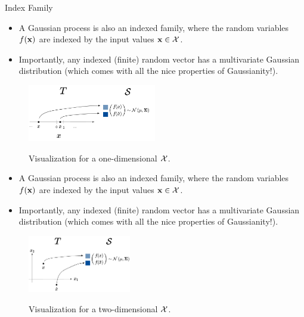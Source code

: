 \begin{frame}[c,allowframebreaks]{Index Family}
\begin{itemize}
  \item A Gaussian process is also an indexed family, where the random variables $f(\mathbf{x})$ are indexed by the input values $\mathbf{x}\in\mathcal{X}$. 
  \item Importantly, any indexed (finite) random vector has a multivariate Gaussian distribution (which comes with all the nice properties of Gaussianity!). 
\end{itemize}

\lz

\begin{figure}
\includegraphics[width=0.5\textwidth]{figure_man/indexed_family/indexed_family_5.png}\par
\begin{footnotesize}
Visualization for a one-dimensional $\mathcal{X}$.
\end{footnotesize}
\end{figure}


\framebreak

\begin{itemize}
  \item A Gaussian process is also an indexed family, where the random variables $f(\mathbf{x})$ are indexed by the input values $\mathbf{x}\in\mathcal{X}$. 
  \item Importantly, any indexed (finite) random vector has a multivariate Gaussian distribution (which comes with all the nice properties of Gaussianity!). 
\end{itemize}

\lz

\begin{figure}
\includegraphics[width=0.4\textwidth]{figure_man/indexed_family/indexed_family_6.png}\par
\begin{footnotesize}
Visualization for a two-dimensional $\mathcal{X}$.
\end{footnotesize}
\end{figure}


\end{frame}
